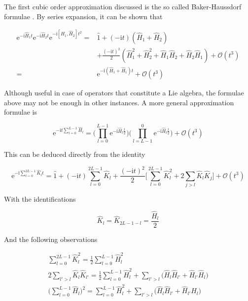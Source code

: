   The first cubic order approximation discussed is the so called Baker-Haussdorf formulae \cite{Nielsen}. By series expansion, it can be shown that

  \begin{align*}
    \mathrm{e}^{-\mathrm{i}\hat{H}_1t}\mathrm{e}^{-\mathrm{i}\hat{H}_2t}\mathrm{e}^{-\mathrm{i}[\hat{H}_1,\hat{H}_2]t^2} = & \hat{1} + (-\mathrm{i}t) (\hat{H}_1 + \hat{H}_2) \\
    & + \frac{(-\mathrm{i}t)^2}{2}(\hat{H}_1^2 + \hat{H}_2^2 + \hat{H}_1\hat{H}_2 + \hat{H}_2\hat{H}_1) + \mathcal{O}(t^3) \\
    = & \mathrm{e}^{-\mathrm{i}(\hat{H}_1 + \hat{H}_1)t} + \mathcal{O}(t^3)
    \label{eq:Hausdorf1}
  \end{align*}

  Although useful in case of operators that constitute a Lie algebra, the formulae above may not be enough in other instances. A more general approximation formulae is

  \begin{equation}
    \mathrm{e}^{-\mathrm{i}t\sum_{l = 0}^{L-1}\hat{H}_l} = \Bigg(\prod_{l = 0}^{L-1}\mathrm{e}^{-\mathrm{i}\hat{H}_l\frac{t}{2}}\Bigg)\Bigg(\prod_{l = L-1}^{0}\mathrm{e}^{-\mathrm{i}\hat{H}_l\frac{t}{2}}\Bigg) + \mathcal{O}(t^3)
    \label{eq:Suzuki0}
  \end{equation}

  This can be deduced directly from the identity

  \begin{equation}
    \mathrm{e}^{-\mathrm{i}\sum_{l = 0}^{2L-1} \hat{K}_l t} = \hat{1} + (-\mathrm{i}t)\sum_{l = 0}^{2L-1} \hat{K}_l + \frac{(-\mathrm{i}t)^2}{2} \Bigg[\sum_{l = 0}^{2L-1} \hat{K}_l^2 + 2 \sum_{j > l}\hat{K}_l \hat{K}_j\Bigg] + \mathcal{O}(t^3)
    \label{eq:TrotterFormula1}
  \end{equation}

  With the identifications

  \begin{equation}
    \hat{K}_l = \hat{K}_{2L-1-l} = \frac{\hat{H}_l}{2}
    \label{eq:Identifications}
  \end{equation}

  And the following observations

  \begin{equation}
    \begin{gathered}
      \sum_{l = 0}^{2L-1} \hat{K}_l^2 = \frac{1}{2}\sum_{l = 0}^{L-1} \hat{H}_l^2 \\
      2\sum_{l' > l} \hat{K}_{l} \hat{K}_{l'} = \frac{1}{2}\sum_{l = 0}^{L-1} \hat{H}_l^2 + \sum_{l'> l} \Bigg( \hat{H}_{l} \hat{H}_{l'} + \hat{H}_{l'} \hat{H}_{l}\Bigg)\\
      \Bigg(\sum_{l = 0}^{L-1} \hat{H}_l \Bigg)^2 = \sum_{l = 0}^{L-1} \hat{H}_l^2 + \sum_{l'> l} \Bigg( \hat{H}_{l} \hat{H}_{l'} + \hat{H}_{l'} \hat{H}_{l}\Bigg)\\
    \end{gathered}
  \end{equation}

